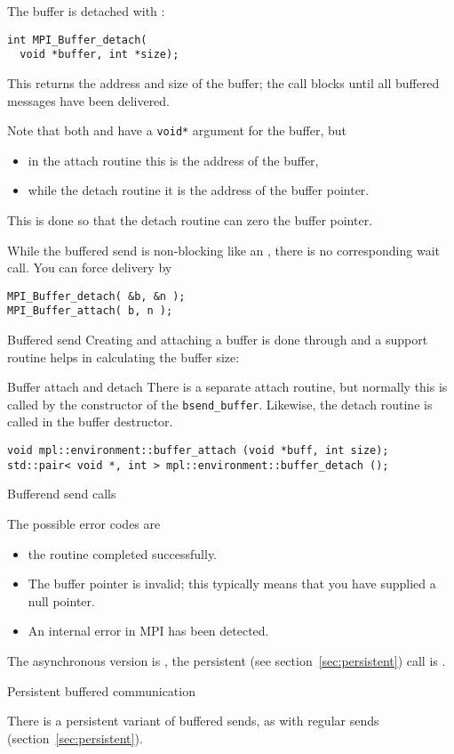 The buffer is detached with :
\begin{lstlisting}
int MPI_Buffer_detach(
  void *buffer, int *size);
\end{lstlisting}
This returns the address and size of the buffer; the call blocks
until all buffered messages have been delivered.

Note that both
 and 
have a \lstinline+void*+ argument for the buffer, but 
\begin{itemize}
\item in the attach routine this is the address of the buffer,
\item while the detach routine it is the address of the buffer pointer.
\end{itemize}
This is done so that the detach routine can zero the buffer pointer.

While the buffered send is non-blocking like an ,
there is no corresponding wait call.
You can force delivery by
\begin{lstlisting}
MPI_Buffer_detach( &b, &n );
MPI_Buffer_attach( b, n );
\end{lstlisting}

\begin{mplnote}{Buffered send}
  Creating and attaching a buffer is done through 
  and a support routine  helps in calculating
  the buffer size:
\end{mplnote}

\begin{mplnote}{Buffer attach and detach}
  There is a separate attach routine, but normally this is called
  by the constructor of the \lstinline+bsend_buffer+.
  Likewise, the detach routine is called in the buffer destructor.
\begin{lstlisting}
void mpl::environment::buffer_attach (void *buff, int size);
std::pair< void *, int > mpl::environment::buffer_detach ();
\end{lstlisting}
\end{mplnote}

 {Bufferend send calls}

The possible error codes are
\begin{itemize}
\item {} the routine completed successfully.
\item {} The buffer pointer is invalid;
  this typically means that you have supplied a null pointer.
\item {} An internal error in MPI has been detected.
\end{itemize}

The asynchronous version is , the persistent
(see section~\ref{sec:persistent}) call is .

 {Persistent buffered communication}

There is a persistent variant 
of buffered sends, as with regular
sends (section~\ref{sec:persistent}).

